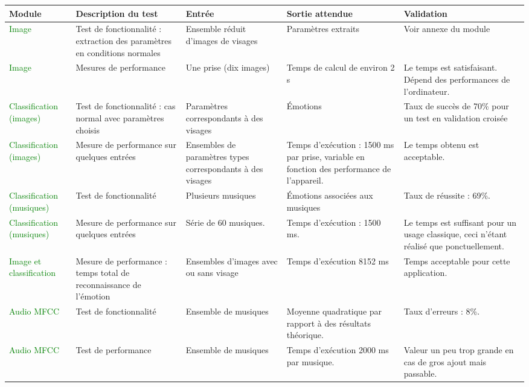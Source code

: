 \setlongtables

\begin{longtable}{m{1.9cm}|m{3.9cm}|m{2.9cm}|m{2.9cm}|m{2.5cm}}
	\textbf{Module} & \textbf{Description du test} & \textbf{Entrée} & \textbf{Sortie attendue} & \textbf{Validation} \\
	\hline
	\endhead

	\textcolor{Green}{Image} &
		Test de fonctionnalité : extraction des paramètres en conditions normales &
		Ensemble réduit d'images de visages &
		Paramètres extraits &
		Voir annexe du module \\
	\hline

	\textcolor{Green}{Image} &
		Mesures de performance &
		Une prise (dix images) &
		Temps de calcul de environ 2 s &
		Le temps est satisfaisant.
		Dépend des performances de l'ordinateur. \\
	\hline

	\textcolor{Green}{Classification (images)} &
		Test de fonctionnalité : cas normal avec paramètres choisis &
		Paramètres correspondants à des visages &
		Émotions &
		Taux de succès de 70\% pour un test en validation croisée \\
	\hline

	\textcolor{Green}{Classification (images)} &
		Mesure de performance sur quelques entrées &
		Ensembles de paramètres types correspondants à des visages &
		Temps d'exécution : 1500 ms par prise, variable en fonction des performance de l'appareil. &
		Le temps obtenu est acceptable. \\
	\hline

	\textcolor{Green}{Classification (musiques)} &
		Test de fonctionnalité &
		Plusieurs musiques &
		Émotions associées aux musiques &
		Taux de réussite : 69\%. \\
	\hline

	\textcolor{Green}{Classification (musiques)} &
		Mesure de performance sur quelques entrées &
		Série de 60 musiques. &
		Temps d'exécution : 1500 ms. &
		Le temps est suffisant pour un usage classique, ceci n'étant réalisé que ponctuellement. \\
	\hline

	\textcolor{Green}{Image et classification} &
		Mesure de performance : temps total de reconnaissance de l'émotion &
		Ensembles d'images avec ou sans visage &
		Temps d'exécution 8152 ms &
		Temps acceptable pour cette application. \\
	\hline

	\textcolor{Green}{Audio MFCC} &
		Test de fonctionnalité &
		Ensemble de musiques &
		Moyenne quadratique par rapport à des résultats théorique. &
		Taux d'erreurs : 8\%. \\
	\hline

	\textcolor{Green}{Audio MFCC} &
		Test de performance &
		Ensemble de musiques &
		Temps d'exécution 2000 ms par musique. &
		Valeur un peu trop grande en cas de gros ajout mais passable. \\
	\hline
	
\end{longtable}